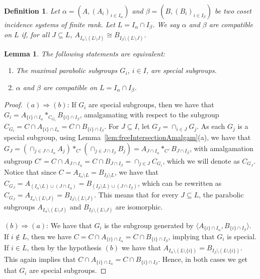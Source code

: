 \documentclass[11pt,letterpaper]{amsart}
\newtheorem{lemma}[prop]{Lemma}
\newtheorem{definition}[prop]{Definition}
\begin{document}
\begin{definition}
    Let $\alpha = (A, (A_i)_{i \in I_\alpha})$ and $ \beta =(B, (B_i)_{i \in I_\beta})$ be two coset incidence systems of finite rank. Let $L = I_\alpha \cap I_\beta$.
    We say $\alpha$ and $\beta$ are \emph{compatible on $L$}
    if, for all $J\subseteq L$, $A_{I_\alpha\setminus (L\setminus J)} \cong B_{I_\beta\setminus (L\setminus J)}$.
\end{definition}

\begin{lemma}\label{lem:equivSpecialSubAmalg}
    The following statements are equivalent:
    \begin{enumerate}
        \item The maximal parabolic subgroups $G_i$, $i \in I$, are special subgroups.
        \item $\alpha$ and $\beta$ are compatible on $L=I_\alpha\cap I_\beta$.
    \end{enumerate}
\end{lemma}
\begin{proof}
    $(a)\Rightarrow (b)$: If $G_i$ are special subgroups, then we have that $G_i = A_{\{i\} \cap I_\alpha} *_{C_{G_i}} B_{ \{i\} \cap I_\beta}$, amalgamating with respect to the subgroup $C_{G_i} = C\cap A_{\{i\} \cap I_\alpha} = C \cap   B_{ \{i\} \cap I_\beta}$.
    For $J\subseteq I$, let $G_J = \cap_{i\in J} G_j$.
    As each $G_j$ is a special subgroup, using Lemma~\ref{lem:freeIntersectionAmalgam}(a), we have that $G_J = (\cap_{j \in J\cap I_\alpha}A_j) *_{C'} (\cap_{j \in J\cap I_\beta}B_j) = A_{J\cap I_\alpha} *_{C'} B_{J\cap I_\beta}$, with amalgamation subgroup $C'= C \cap A_{J\cap I_\alpha} = C \cap B_{J\cap I_\beta} = \cap_{j\in J} C_{G_i}$, which we will denote as $C_{G_J}$.
    Notice that since $C = A_{I_\alpha\setminus L} = B_{I_\beta\setminus L}$, we have that $C_{G_J} = A_{(I_\alpha\setminus L) \cup (J\cap I_\alpha)} = B_{(I_\beta\setminus L) \cup (J\cap I_\beta)}$, which can be rewritten as 
    $C_{G_J} = A_{I_\alpha\setminus (L\setminus J)} = B_{I_\beta\setminus (L\setminus J)}$. This means that for every $J \subseteq  L$, the parabolic subgroups $A_{I_\alpha\setminus (L\setminus J)}$ and $B_{I_\beta\setminus (L\setminus J)}$ are isomorphic. 

    $(b)\Rightarrow (a)$: We have that $G_i$ is the subgroup generated by $\langle A_{\{i\}\cap I_\alpha}, B_{\{i\}\cap I_\beta}\rangle$. If $i\notin L$, then we have $C = C \cap A_{\{i\}\cap I_\alpha} = C \cap B_{\{i\}\cap I_\beta}$, implying that $G_i$ is special. If $i\in L$, then by the hypothesis $(b)$ we have that $A_{I_\alpha\setminus(L\setminus\{i\})}= B_{I_\beta\setminus(L\setminus\{i\})}$. This again implies that $C \cap A_{\{i\}\cap I_\alpha} = C \cap B_{\{i\}\cap I_\beta}$. Hence, in both cases we get that $G_i$ are special subgroups.
\end{proof}
\end{document}
